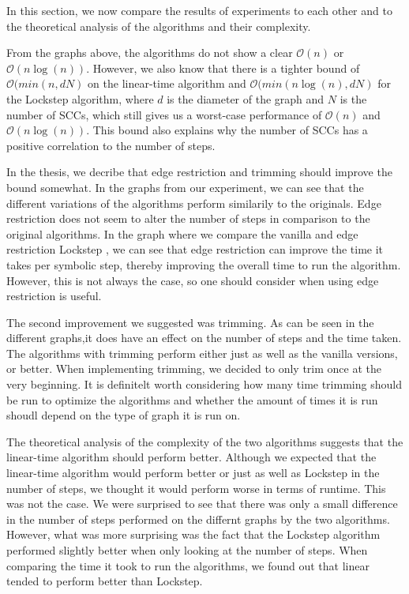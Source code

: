 \documentclass[../master/master.tex]{subfiles}
\begin{document}
In this section, we now compare the results of experiments to each other and to the theoretical analysis of the algorithms and their complexity.

From the graphs above, the algorithms do not show a clear $\mathcal{O}(n)$ or $\mathcal{O}(n\log(n))$. However, we also know that there is a tighter bound of $\mathcal{O}(min(n, dN)$ on the linear-time algorithm and $\mathcal{O}(min(n\log(n), dN)$ for the Lockstep algorithm, where $d$ is the diameter of the graph and $N$ is the number of SCCs, which still gives us a worst-case performance of $\mathcal{O}(n)$ and $\mathcal{O}(n\log(n))$. This bound also explains why the number of SCCs has a positive correlation to the number of steps.

In the thesis, we decribe that edge restriction and trimming should improve the bound somewhat. In the graphs from our experiment, we can see that the different variations of the algorithms perform similarily to the originals. Edge restriction does not seem to alter the number of steps in comparison to the original algorithms. In the graph where we compare the vanilla and edge restriction Lockstep , we can see that edge restriction can improve the time it takes per symbolic step, thereby improving the overall time to run the algorithm. However, this is not always the case, so one should consider when using edge restriction is useful.

The second improvement we suggested was trimming. As can be seen in the different graphs,it does have an effect on the number of steps and the time taken. The algorithms with trimming perform either just as well as the vanilla versions, or better. When implementing trimming, we decided to only trim once at the very beginning. It is definitelt worth considering how many time trimming should be run to optimize the algorithms and whether the amount of times it is run shoudl depend on the type of graph it is run on.

The theoretical analysis of the complexity of the two algorithms suggests that the linear-time algorithm should perform better.  Although we expected that the linear-time algorithm would perform better or just as well as Lockstep in the number of steps, we thought it would perform worse in terms of runtime. This was not the case. We were surprised to see that there was only a small difference in the number of steps performed on the differnt graphs by the two algorithms. However, what was more surprising was the fact that the Lockstep algorithm performed slightly better when only looking at the number of steps. When comparing the time it took to run the algorithms, we found out that linear tended to perform better than Lockstep.
\end{document}
